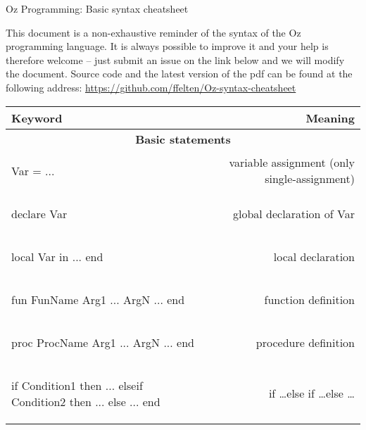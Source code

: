 \documentclass[12pt]{article}
\author{Felten Florian}
\begin{document}
\vspace*{2em}
\begin{center} %
	{\Large Oz Programming: Basic syntax cheatsheet}
\end{center}

This document is a non-exhaustive reminder of the syntax of the Oz programming language. It is always possible to improve it and your help is therefore welcome -- just submit an issue on the link below and we will modify the document. Source code and the latest version of the pdf can be found at the following address:
\url{https://github.com/ffelten/Oz-syntax-cheatsheet}

\renewcommand*{\arraystretch}{1.5}
\begin{longtable}{l r}
\toprule[0.2em]
\multicolumn{1}{l}{\textbf{Keyword}} & \textbf{Meaning}\\
\midrule[0.3mm]


\multicolumn{2}{c}{\textbf{Basic statements}}\\
\midrule[0.3mm]

\begin{oz}
Var = ...
\end{oz}
&variable assignment (only single-assignment)\\
\hline

\begin{oz}
declare Var 
\end{oz}
&global declaration of Var\\
\hline
 
\begin{oz}
local Var in 
  ...
end
\end{oz}
&local declaration\\
\hline
 
 
\begin{oz}
fun {FunName Arg1 ... ArgN}
  ...
end
\end{oz}
&function definition\\
\hline
 
\begin{oz}
proc {ProcName Arg1 ... ArgN}
  ...
end
\end{oz}
&procedure definition\\
\hline

\begin{oz}
if Condition1 then ...
elseif Condition2 then ...
else ...
end
\end{oz}
&if \dots else if \dots else \dots \\
\hline
 

\end{longtable}
\end{document}
